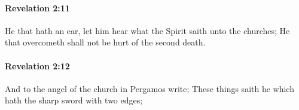 		\paragraph{Revelation 2:11} %
			\label{REVELATIONNT-2-11}

			He that hath an ear, let him hear what the Spirit saith unto the churches; He that overcometh shall not be hurt of the second death.

			\begin{framed}
			\scriptsize
				\begin{compactdesc}
					\item[SBLG] 
				\end{compactdesc}
			\end{framed}

		\paragraph{Revelation 2:12} %
			\label{REVELATIONNT-2-12}

			And to the angel of the church in Pergamos write; These things saith he which hath the sharp sword with two edges;

